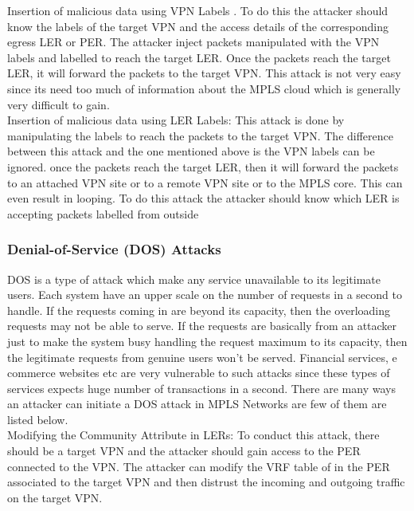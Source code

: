     Insertion of malicious data using VPN Labels . To do this the attacker should know the labels of the target VPN and the access details of the corresponding egress LER or PER. The attacker inject packets manipulated with the VPN labels and labelled to reach the target LER. Once the packets reach the target LER, it will forward the packets to the target VPN. This attack is not very easy since its need too much of information about the MPLS cloud which is generally very difficult to gain.\\
    
    Insertion of malicious data using LER Labels: This attack is done by manipulating the labels to reach the packets to the target VPN.  The difference between this attack and the one mentioned above is the VPN labels can be ignored. once the packets reach the target LER, then it will forward the packets to an attached VPN site or to a remote VPN site or to the MPLS core. This can even result in looping. To do this attack the attacker should know which LER is accepting packets labelled from outside\\
    
     \subsubsection{Denial-of-Service (DOS) Attacks}
      

DOS is a type of attack which make any service unavailable to its legitimate users. Each system have an upper scale on the number of requests in a second to handle. If the requests coming in are beyond its capacity, then the overloading requests may not be able to serve. If the requests are basically from an attacker just to make the system busy handling the request maximum to its capacity, then the legitimate requests from genuine users won’t be served. Financial services, e commerce websites etc are very vulnerable to such attacks since these types of services expects huge number of transactions in a second. There are many ways an attacker can initiate a DOS attack in MPLS Networks are few of them are listed below.\\

    Modifying the Community Attribute in LERs: To conduct this attack, there should be a target VPN and the attacker should gain access to the PER connected to the VPN. The attacker can modify the VRF table of in the PER associated to the target VPN and then distrust the incoming and outgoing traffic on the target VPN. \\


